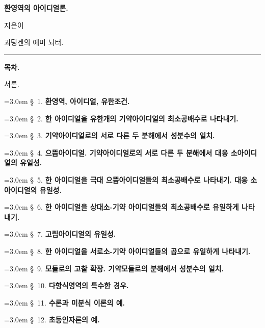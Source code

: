 
\begin{center}
{\Large\bfseries 환영역의 아이디얼론.}\par
\vspace{0.7em}
지은이\par
\vspace{0.25em}
괴팅겐의 에미 뇌터.\par
\vspace{0.9em}
\rule{4em}{0.4pt}\par
\vspace{0.9em}
{\large\bfseries 목차.}
\end{center}
\noindent 서론.\par
\noindent\hangindent=3.0em \S~1. \textbf{환영역, 아이디얼, 유한조건.}\par
\noindent\hangindent=3.0em \S~2. \textbf{한 아이디얼을 유한개의 기약아이디얼의 최소공배수로 나타내기.}\par
\noindent\hangindent=3.0em \S~3. \textbf{기약아이디얼로의 서로 다른 두 분해에서 성분수의 일치.}\par
\noindent\hangindent=3.0em \S~4. \textbf{으뜸아이디얼. 기약아이디얼로의 서로 다른 두 분해에서 대응 소아이디얼의 유일성.}\par
\noindent\hangindent=3.0em \S~5. \textbf{한 아이디얼을 극대 으뜸아이디얼들의 최소공배수로 나타내기. 대응 소아이디얼의 유일성.}\par
\noindent\hangindent=3.0em \S~6. \textbf{한 아이디얼을 상대소-기약 아이디얼들의 최소공배수로 유일하게 나타내기.}\par
\noindent\hangindent=3.0em \S~7. \textbf{고립아이디얼의 유일성.}\par
\noindent\hangindent=3.0em \S~8. \textbf{한 아이디얼을 서로소-기약 아이디얼들의 곱으로 유일하게 나타내기.}\par
\noindent\hangindent=3.0em \S~9. \textbf{모듈로의 고찰 확장. 기약모듈로의 분해에서 성분수의 일치.}\par
\noindent\hangindent=3.0em \S~10. \textbf{다항식영역의 특수한 경우.}\par
\noindent\hangindent=3.0em \S~11. \textbf{수론과 미분식 이론의 예.}\par
\noindent\hangindent=3.0em \S~12. \textbf{초등인자론의 예.}\par


